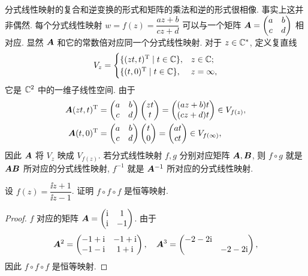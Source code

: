 分式线性映射的复合和逆变换的形式和矩阵的乘法和逆的形式很相像.
事实上这并非偶然.
每个分式线性映射 $w=f(z)=\dfrac{az+b}{cz+d}$ 可以与一个矩阵 ${\boldsymbol{A}}=\begin{pmatrix}
  a&b\\c&d
\end{pmatrix}$ 相对应.
显然 ${\boldsymbol{A}}$ 和它的常数倍对应同一个分式线性映射.
对于 $z\in{\mathbb{C}}^*$, 定义复直线
\[
  V_z=\begin{cases}
    \{(zt,t)^{\mathrm{T}}\mid t\in{\mathbb{C}}\},&z\in{\mathbb{C}};\\
    \{(t,0)^{\mathrm{T}}\mid t\in{\mathbb{C}}\},&z=\infty,
  \end{cases}
\]
它是 ${\mathbb{C}}^2$ 中的一维子线性空间.
由于
\begin{align*}
   {\boldsymbol{A}}(zt,t)^{\mathrm{T}}&
  =\begin{pmatrix}
    a&b\\
    c&d
  \end{pmatrix}\begin{pmatrix}
    zt\\
    t
  \end{pmatrix}
  =\begin{pmatrix}
    (az+b)t\\
    (cz+d)t
  \end{pmatrix}\in V_{f(z)},\\
   {\boldsymbol{A}}(t,0)^{\mathrm{T}}&
  =\begin{pmatrix}
    a&b\\
    c&d
  \end{pmatrix}\begin{pmatrix}
    t\\
    0
  \end{pmatrix}
  =\begin{pmatrix}
    at\\
    ct
  \end{pmatrix}\in V_{f(\infty)},
\end{align*}
因此 ${\boldsymbol{A}}$ 将 $V_z$ 映成 $V_{f(z)}$.
若分式线性映射 $f,g$ 分别对应矩阵 ${\boldsymbol{A}},{\boldsymbol{B}}$, 则 $f\circ g$ 就是 ${\boldsymbol{A}}{\boldsymbol{B}}$ 所对应的分式线性映射, $f^{-1}$ 就是 ${\boldsymbol{A}}^{-1}$ 所对应的分式线性映射.

\begin{example}
  设 $f(z)=\dfrac{\ii z+1}{\ii z-1}$.
  证明 $f\circ f\circ f$ 是恒等映射.
\end{example}

\begin{proof}
  $f$ 对应的矩阵 ${\boldsymbol{A}}=\begin{pmatrix}
    \mathrm{i}&1\\
    \mathrm{i}&-1
  \end{pmatrix}$.
  由于
  \[
    {\boldsymbol{A}}^2=\begin{pmatrix}
      -1+\mathrm{i}&-1+\mathrm{i}\\
      -1-\mathrm{i}&1+\mathrm{i}
    \end{pmatrix},\quad
    {\boldsymbol{A}}^3=\begin{pmatrix}
      -2-2\mathrm{i}&\\
      &-2-2\mathrm{i}
    \end{pmatrix},
  \]
  因此 $f\circ f\circ f$ 是恒等映射.
\end{proof}

